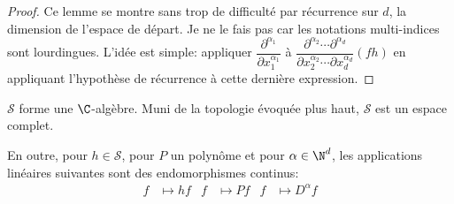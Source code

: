 \begin{proof}
Ce lemme se montre sans trop de difficulté par récurrence sur $d$, la dimension de l'espace de départ. Je ne le fais pas car les notations multi-indices sont lourdingues. L'idée est simple: appliquer $\dfrac{\partial^{\alpha_1}}{\partial x_1^{\alpha_1}}$ à $\dfrac{\partial^{\alpha_2} \cdots \partial^{\alpha_d}}{\partial x_2^{\alpha_2} \cdots \partial x_d^{\alpha_d}} (fh)$ en appliquant l'hypothèse de récurrence à cette dernière expression.
\end{proof}


\begin{prop}
$\mathcal{S}$ forme une $\C$-algèbre. Muni de la topologie évoquée plus haut, $\mathcal{S}$ est un espace complet. 


\medskip
En outre, pour $h \in \mathcal{S}$, pour $P$ un polynôme et pour $\alpha \in \N^d$, les applications linéaires suivantes sont des endomorphismes continus:
\begin{align*}
f & \mapsto hf &
f & \mapsto Pf &
f & \mapsto D^{\alpha} f
\end{align*}
\end{prop}


